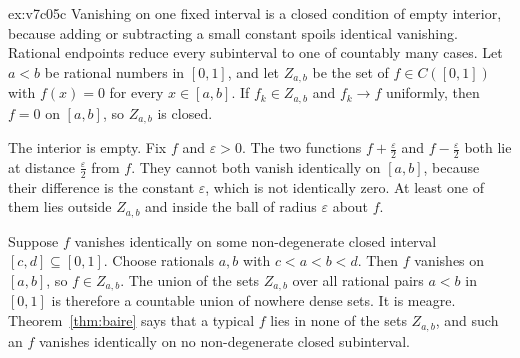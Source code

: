 \begin{solution}{ex:v7c05c}
\idea Vanishing on one fixed interval is a closed condition of empty interior, because adding or subtracting a small constant spoils identical vanishing. Rational endpoints reduce every subinterval to one of countably many cases.
\writeup Let $a<b$ be rational numbers in $[0,1]$, and let $Z_{a,b}$ be the set of $f\in C([0,1])$ with $f(x)=0$ for every $x\in[a,b]$. If $f_k\in Z_{a,b}$ and $f_k\to f$ uniformly, then $f=0$ on $[a,b]$, so $Z_{a,b}$ is closed.

The interior is empty. Fix $f$ and $\varepsilon>0$. The two functions $f+\frac\varepsilon2$ and $f-\frac\varepsilon2$ both lie at distance $\frac\varepsilon2$ from $f$. They cannot both vanish identically on $[a,b]$, because their difference is the constant $\varepsilon$, which is not identically zero. At least one of them lies outside $Z_{a,b}$ and inside the ball of radius $\varepsilon$ about $f$.

Suppose $f$ vanishes identically on some non-degenerate closed interval $[c,d]\subseteq[0,1]$. Choose rationals $a,b$ with $c<a<b<d$. Then $f$ vanishes on $[a,b]$, so $f\in Z_{a,b}$. The union of the sets $Z_{a,b}$ over all rational pairs $a<b$ in $[0,1]$ is therefore a countable union of nowhere dense sets. It is meagre. Theorem~\ref{thm:baire} says that a typical $f$ lies in none of the sets $Z_{a,b}$, and such an $f$ vanishes identically on no non-degenerate closed subinterval.
\end{solution}

